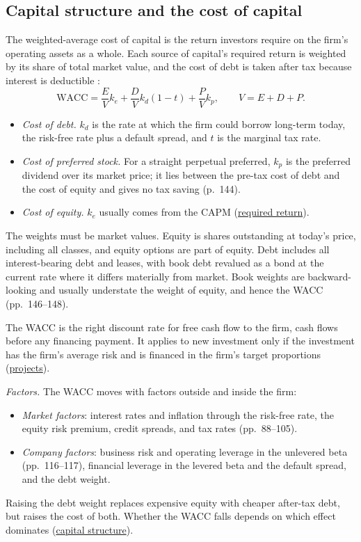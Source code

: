 \subsection{Capital structure and the cost of capital}

\begin{qfmethod}\label{meth:wacc-calculation}
 The weighted-average cost of capital is the return investors require on the firm's operating assets as a whole. Each source of capital's required return is weighted by its share of total market value, and the cost of debt is taken after tax because interest is deductible \citep[pp.~137, 144--148]{applied-corporate-finance-2014}:
\[ \mathrm{WACC}=\frac{E}{V}k_e+\frac{D}{V}k_d(1-t)+\frac{P}{V}k_p,\qquad V=E+D+P. \]
\begin{itemize}
\item \emph{Cost of debt.} $k_d$ is the rate at which the firm could borrow long-term today, the risk-free rate plus a default spread, and $t$ is the marginal tax rate.
\item \emph{Cost of preferred stock.} For a straight perpetual preferred, $k_p$ is the preferred dividend over its market price; it lies between the pre-tax cost of debt and the cost of equity and gives no tax saving (p.~144).
\item \emph{Cost of equity.} $k_e$ usually comes from the CAPM (\hyperref[meth:required-return-on-equity]{required return}).
\end{itemize}
The weights must be market values. Equity is shares outstanding at today's price, including all classes, and equity options are part of equity. Debt includes all interest-bearing debt and leases, with book debt revalued as a bond at the current rate where it differs materially from market. Book weights are backward-looking and usually understate the weight of equity, and hence the WACC (pp.~146--148).

The WACC is the right discount rate for free cash flow to the firm, cash flows before any financing payment. It applies to new investment only if the investment has the firm's average risk and is financed in the firm's target proportions (\hyperref[meth:capital-project-evaluation]{projects}).

\emph{Factors.} The WACC moves with factors outside and inside the firm:
\begin{itemize}
\item \emph{Market factors}: interest rates and inflation through the risk-free rate, the equity risk premium, credit spreads, and tax rates (pp.~88--105).
\item \emph{Company factors}: business risk and operating leverage in the unlevered beta (pp.~116--117), financial leverage in the levered beta and the default spread, and the debt weight.
\end{itemize}
Raising the debt weight replaces expensive equity with cheaper after-tax debt, but raises the cost of both. Whether the WACC falls depends on which effect dominates (\hyperref[mod:capital-structure-theory]{capital structure}).


\end{qfmethod}
